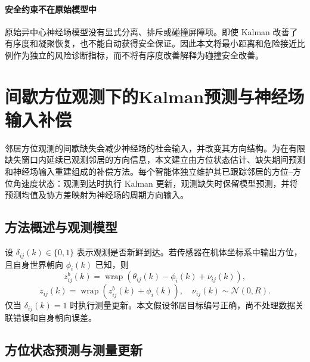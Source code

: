 \documentclass[UTF8,fontset=windows,11pt]{ctexart}
\begin{document}
\paragraph{安全约束不在原始模型中}
原始异中心神经场模型没有显式分离、排斥或碰撞屏障项。即使 Kalman 改善了有序度和凝聚恢复，也不能自动获得安全保证。因此本文将最小距离和危险接近比例作为独立的风险诊断指标，而不将有序度改善解释为碰撞安全改善。

\section{间歇方位观测下的Kalman预测与神经场输入补偿}

邻居方位观测的间歇缺失会减少神经场的社会输入，并改变其方向结构。为在有限缺失窗口内延续已观测邻居的方向信息，本文建立由方位状态估计、缺失期间预测和神经场输入重建组成的补偿方法。每个智能体独立维护其已跟踪邻居的方位--方位角速度状态：观测到达时执行 Kalman 更新，观测缺失时保留模型预测，并将预测均值及协方差映射为神经场的周期方向输入。

\subsection{方法概述与观测模型}
设 $\delta_{ij}(k)\in\{0,1\}$ 表示观测是否新鲜到达。若传感器在机体坐标系中输出方位，且自身世界朝向 $\phi_i(k)$ 已知，则
\begin{equation}
 z^b_{ij}(k)=\operatorname{wrap}(\theta_{ij}(k)-\phi_i(k)+\nu_{ij}(k)),
\end{equation}
\begin{equation}
 z_{ij}(k)=\operatorname{wrap}(z^b_{ij}(k)+\phi_i(k)),
 \quad \nu_{ij}(k)\sim\mathcal N(0,R).
\end{equation}
仅当 $\delta_{ij}(k)=1$ 时执行测量更新。本文假设邻居目标编号正确，尚不处理数据关联错误和自身朝向误差。

\subsection{方位状态预测与测量更新}
\end{document}

